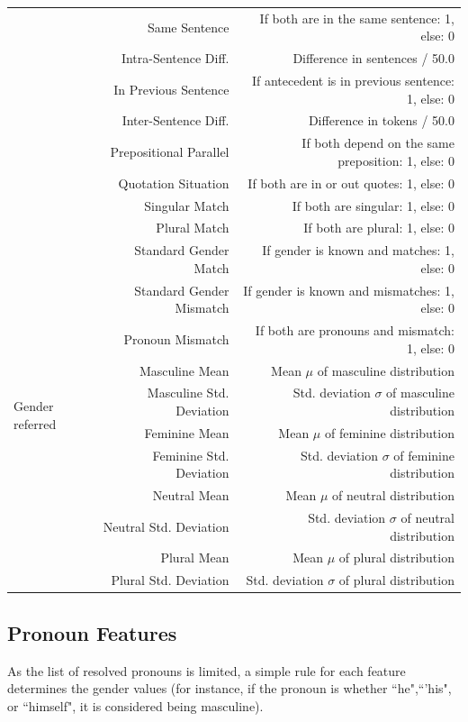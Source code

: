 \begin{table}[p]
{\begin{tabular}{| l |r | r |}
 	& Same Sentence &  If both are in the same sentence: 1, else: 0 \\	\cline{2-3}
	& Intra-Sentence Diff. &  Difference in sentences / 50.0 \\	\cline{2-3}
	& In Previous Sentence & If antecedent is in previous sentence: 1, else: 0 \\ \cline{2-3}
	& Inter-Sentence Diff. & Difference in tokens / 50.0\\ \cline{2-3}
	& Prepositional Parallel & If both depend on the same preposition: 1, else: 0 \\ \cline{2-3}
	& Quotation Situation & If both are in or out quotes: 1, else: 0 \\ \cline{2-3}
	& Singular Match & If both are singular: 1, else: 0 \\ \cline{2-3}
	& Plural Match & If both are plural: 1, else: 0 \\ \hline
	\hline
	\multirow{11}{1.3cm}{Gender referred} & Standard Gender Match & If gender is known and matches: 1, else: 0 \\ \cline{2-3}
 	& Standard Gender Mismatch &  If gender is known and mismatches: 1, else: 0 \\	\cline{2-3}
	& Pronoun Mismatch &  If both are pronouns and mismatch: 1, else: 0 \\	\cline{2-3}
	& Masculine Mean & Mean $\mu$ of masculine distribution \\ \cline{2-3}
	& Masculine Std. Deviation & Std. deviation $\sigma$ of masculine distribution \\ \cline{2-3}
	& Feminine Mean &  Mean $\mu$ of feminine distribution \\ \cline{2-3}
	& Feminine Std. Deviation & Std. deviation $\sigma$  of feminine distribution \\ \cline{2-3}
	& Neutral Mean &  Mean $\mu$ of neutral distribution \\ \cline{2-3}
	& Neutral Std. Deviation & Std. deviation $\sigma$  of neutral distribution \\ \cline{2-3}
	& Plural Mean &  Mean $\mu$ of plural distribution \\ \cline{2-3}
	& Plural Std. Deviation & Std. deviation $\sigma$  of plural distribution \\ \hline

  \end{tabular}
}
	\label{table:wholefeatureset}
\end{table}

\subsection{Pronoun Features}
As the list of resolved pronouns is limited, a simple rule for each feature determines the gender values (for instance, if the pronoun is whether ``he",``'his", or ``himself", it is considered being masculine). 

